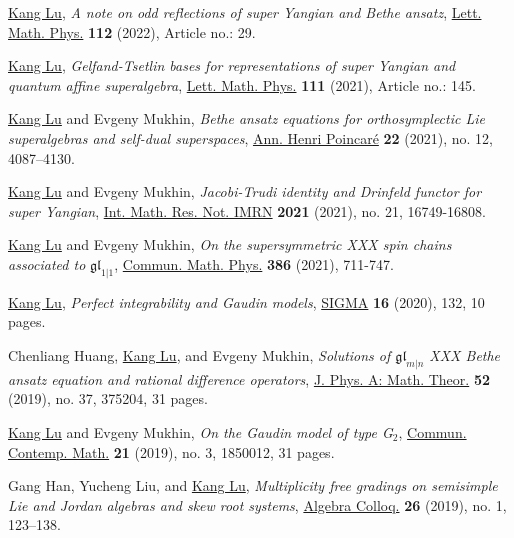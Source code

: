 \documentclass[11pt,letterpaper,roman,colorlinks,urlcolor=blue,linkcolor=blue
]{moderncv}
\begin{document}
\begin{etaremune}[leftmargin=1.17cm]
\item \underline{Kang Lu}, {\textit{A note on odd reflections of super Yangian and Bethe ansatz}}, \href{https://link.springer.com/article/10.1007/s11005-022-01524-3}{Lett. Math. Phys.} \textbf{112} (2022), Article no.: 29.

\item \underline{Kang Lu}, {\textit{Gelfand-Tsetlin bases for representations of super Yangian and quantum affine superalgebra}}, \href{https://link.springer.com/article/10.1007/s11005-021-01488-w}{Lett. Math. Phys.} \textbf{111} (2021), Article no.: 145.

\item \underline{Kang Lu} and Evgeny Mukhin, {\textit{Bethe ansatz equations for orthosymplectic Lie superalgebras and self-dual superspaces}}, \href{https://doi.org/10.1007/s00023-021-01091-8}{Ann. Henri Poincar\'{e}} \textbf{22} (2021), no. 12, 4087--4130.

\item \underline{Kang Lu} and Evgeny Mukhin, {\textit{Jacobi-Trudi identity and Drinfeld functor for super Yangian}}, \href{https://dx.doi.org/10.1093/imrn/rnab023}{Int. Math. Res. Not. IMRN} \textbf{2021} (2021), no. 21, 16749-16808.

\item \underline{Kang Lu} and Evgeny Mukhin, {\textit{On the supersymmetric XXX spin chains associated to} $\mathfrak{gl}_{1|1}$}, \href{https://dx.doi.org/10.1007/s00220-021-04155-2}{Commun. Math. Phys.} \textbf{386} (2021), 711-747.

\item \underline{Kang Lu}, \textit{Perfect integrability and Gaudin models}, \href{https://www.emis.de/journals/SIGMA/2020/132/}{SIGMA} \textbf{16} (2020), 132, 10 pages.
  
\item Chenliang Huang, \underline{Kang Lu}, and Evgeny Mukhin, {\textit{Solutions of $\mathfrak{gl}_{m|n}$ XXX Bethe ansatz equation and rational difference operators}}, \href{https://doi.org/10.1088/1751-8121/ab1960}{J. Phys. A: Math. Theor.} \textbf{52} (2019), no. 37, 375204, 31 pages.   
            
\item \underline{Kang Lu} and Evgeny Mukhin, {\textit{On the Gaudin model of type G$_2$}}, \href{https://doi.org/10.1142/S0219199718500128}{Commun. Contemp. Math.} \textbf{21} (2019), no. 3, 1850012, 31 pages.

\item Gang Han, Yucheng Liu, and \underline{Kang Lu}, {\textit{Multiplicity free gradings on semisimple Lie and Jordan algebras and skew root systems}}, \href{https://doi.org/10.1142/S1005386719000129}{Algebra Colloq.} {\textbf{26}} (2019), no. 1, 123--138.
            

\end{etaremune}
\end{document}
